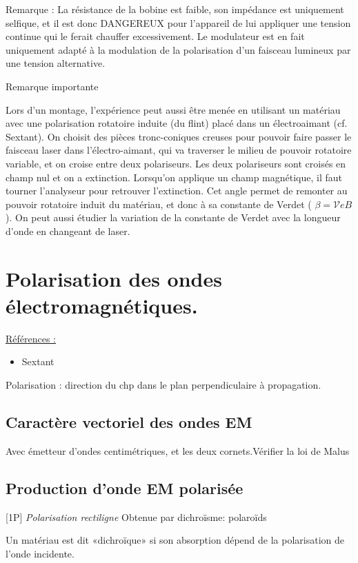 \documentclass{article}%
\begin{document}
Remarque : La résistance de la bobine est faible, son impédance est uniquement selfique, et il est donc DANGEREUX pour l'appareil de lui appliquer une tension continue qui le ferait chauffer excessivement. Le modulateur est en fait uniquement adapté à la modulation de la polarisation d'un faisceau lumineux par une tension alternative.

Remarque importante

Lors d'un montage, l'expérience peut aussi être menée en utilisant un matériau avec une polarisation rotatoire induite (du flint) placé dans un électroaimant (cf. Sextant). On choisit des pièces tronc-coniques creuses pour pouvoir faire passer le faisceau laser dans l'électro-aimant, qui va traverser le milieu de pouvoir rotatoire variable, et on croise entre deux polariseurs. Les deux polariseurs sont croisés en champ nul et on a extinction. Lorsqu'on applique un champ magnétique, il faut tourner l'analyseur pour retrouver l'extinction. Cet angle permet de remonter au pouvoir rotatoire induit du matériau, et donc à sa constante de Verdet ( $\beta = \mathcal{V}eB$ ). On peut aussi étudier la variation de la constante de Verdet avec la longueur d'onde en changeant de laser. 

\section{Polarisation des ondes électromagnétiques.}
\underline{Références :}
\begin{itemize}
	\item Sextant
\end{itemize}

Polarisation : direction du chp dans le plan perpendiculaire à propagation.

\subsection{Caractère vectoriel des ondes EM}
Avec émetteur d'ondes centimétriques, et les deux cornets.Vérifier la loi de Malus

\subsection{Production d'onde EM polarisée}

[1P] \textit{Polarisation rectiligne}
Obtenue par dichroïsme: polaroïds

Un matériau est dit «dichroïque» si son absorption dépend de la polarisation de l'onde incidente.
\end{document}
